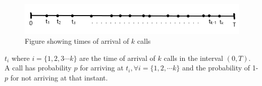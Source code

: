 \begin{figure}[ht]
    \centering
    \includegraphics[width=\columnwidth]{solutions/ec/43/Figures/figure2.png}
    \caption{Figure showing times of arrival of $k$ calls}
    \label{ec43:Figure_2}
\end{figure}
$t_i$ where $i=\{1,2,3\cdots k\}$ are the time of arrival of $k$ calls in the interval $(0,T)$.\\

A call has probability $p$ for arriving at $t_i, \forall  i=\{1,2,\cdots k\}$ and the probability of 1-$p$ for not arriving at that instant.\\

